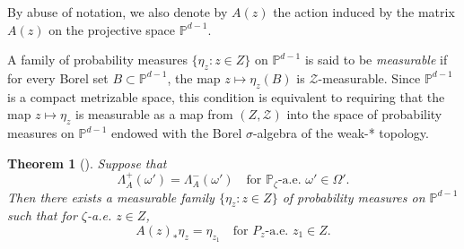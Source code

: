 \documentclass[a4paper,12pt,reqno]{amsart}
\numberwithin{equation}{section}
\newtheorem{theorem}{Theorem}[section]
\newtheorem{remark}[theorem]{Remark}
\newcommand{\cal}{\mathcal}
\newcommand{\ZZ}{{\cal Z}}
\newcommand{\Pp}{{\mathbb{P}}}
\newcommand{\Zz}{{\mathbb{Z}}}
\begin{document}
By abuse of notation, we also denote by $A(z)$ the action induced by the matrix $A(z)$ on the projective space $\Pp^{d-1}$.

A family of probability measures $\{\eta_z : z \in Z\}$ on $\mathbb{P}^{d-1}$ is said to be \emph{measurable} if for every Borel set $B \subset \mathbb{P}^{d-1}$, the map
$z \mapsto \eta_z(B)$ is $\mathcal Z$-measurable. Since $\mathbb{P}^{d-1}$ is a compact metrizable space, this condition is equivalent to requiring that the map
$z \mapsto \eta_z$ is measurable as a map from $(Z,\mathcal Z)$ into the space of probability measures on $\mathbb{P}^{d-1}$ endowed with the Borel $\sigma$-algebra of the weak-* topology.

\begin{theorem}[{\cite[Corollary 2]{Ledrappier:1986ue}}]
\label{thm: Ledrappier}
Suppose that 
\[
\Lambda^+_A(\omega') = \Lambda^-_A(\omega') \quad \text{for } \Pp_{\zeta} \text{-a.e. } \omega' \in \Omega'.
\] 
Then there exists a measurable family $\{\eta_z : z \in Z\}$ of probability measures on $\mathbb{P}^{d-1}$ such that for $\zeta$-a.e. $z \in Z$, 
\[
A(z)_{*} \eta_z = \eta_{z_1} \quad \text{for } P_z  \text{-a.e. } z_1 \in Z.
\]
\end{theorem}


\end{document}
